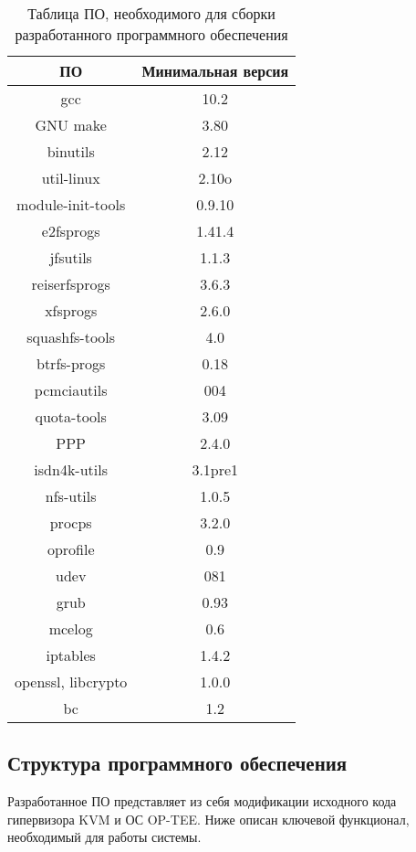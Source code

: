 \begin{table}[h!]
	\begin{center}
		\caption{Таблица ПО, необходимого для сборки разработанного программного обеспечения}
		\label{table:deps}
		\begin{tabular}{|c|c|}
			\hline
			\bfseries ПО & \bfseries Минимальная версия \\
			\hline
			gcc & 10.2 \\ \hline
			GNU make & 3.80 \\ \hline
			binutils & 2.12 \\ \hline
			util-linux & 2.10o \\ \hline
			module-init-tools & 0.9.10 \\ \hline
			e2fsprogs & 1.41.4 \\ \hline
			jfsutils & 1.1.3 \\ \hline
			reiserfsprogs & 3.6.3 \\ \hline
			xfsprogs & 2.6.0 \\ \hline
			squashfs-tools & 4.0 \\ \hline
			btrfs-progs & 0.18 \\ \hline
			pcmciautils & 004 \\ \hline
			quota-tools & 3.09 \\ \hline
			PPP & 2.4.0 \\ \hline
			isdn4k-utils & 3.1pre1 \\ \hline
			nfs-utils & 1.0.5 \\ \hline
			procps & 3.2.0 \\ \hline
			oprofile & 0.9 \\ \hline
			udev & 081 \\ \hline
			grub & 0.93 \\ \hline
			mcelog & 0.6 \\ \hline
			iptables & 1.4.2 \\ \hline
			openssl, libcrypto & 1.0.0 \\ \hline
			bc & 1.2 \\ \hline
		\end{tabular}
	\end{center}
\end{table}

\subsection{Структура программного обеспечения}

Разработанное ПО представляет из себя модификации исходного кода гипервизора KVM и ОС OP-TEE. Ниже описан ключевой функционал, необходимый для работы системы.

